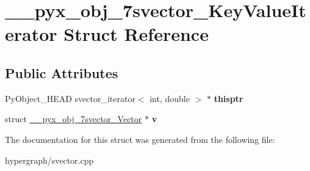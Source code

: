 \hypertarget{struct____pyx__obj__7svector__KeyValueIterator}{
\section{\_\-\_\-pyx\_\-obj\_\-7svector\_\-KeyValueIterator Struct Reference}
\label{struct____pyx__obj__7svector__KeyValueIterator}
}
\subsection*{Public Attributes}
\begin{DoxyCompactItemize}
\item 
\hypertarget{struct____pyx__obj__7svector__KeyValueIterator_aa3c38ee1f42cfe00211142a7cc898083}{
PyObject\_\-HEAD svector\_\-iterator$<$ int, double $>$ $\ast$ {\bfseries thisptr}}
\label{struct____pyx__obj__7svector__KeyValueIterator_aa3c38ee1f42cfe00211142a7cc898083}

\item 
\hypertarget{struct____pyx__obj__7svector__KeyValueIterator_a1eac8cf931e83140e29da31e0a4b9f56}{
struct \hyperlink{struct____pyx__obj__7svector__Vector}{\_\-\_\-pyx\_\-obj\_\-7svector\_\-Vector} $\ast$ {\bfseries v}}
\label{struct____pyx__obj__7svector__KeyValueIterator_a1eac8cf931e83140e29da31e0a4b9f56}

\end{DoxyCompactItemize}


The documentation for this struct was generated from the following file:\begin{DoxyCompactItemize}
\item 
hypergraph/svector.cpp\end{DoxyCompactItemize}

